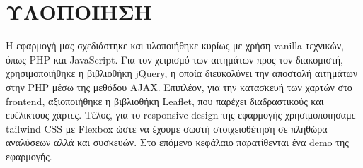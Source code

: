 \chapter{ΥΛΟΠΟΙΗΣΗ}
    Η εφαρμογή μας σχεδιάστηκε και υλοποιήθηκε κυρίως με χρήση vanilla τεχνικών, όπως PHP και JavaScript. Για τον χειρισμό των αιτημάτων προς τον διακομιστή, χρησιμοποιήθηκε η βιβλιοθήκη jQuery, η οποία διευκολύνει την αποστολή αιτημάτων στην PHP μέσω της μεθόδου AJAX. Επιπλέον, για την κατασκευή των χαρτών στο frontend, αξιοποιήθηκε η βιβλιοθήκη Leaflet, που παρέχει διαδραστικούς και ευέλικτους χάρτες. Τέλος, για το responsive design της εφαρμογής χρησιμοποιήσαμε tailwind CSS με Flexbox ώστε να έχουμε σωστή στοιχειοθέτηση σε πληθώρα αναλύσεων αλλά και συσκευών. Στο επόμενο κεφάλαιο παρατίθενται ένα demo της εφαρμογής.

